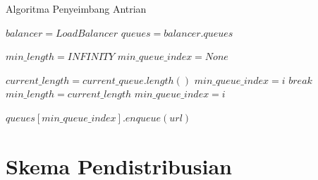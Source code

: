 \begin{algorithm}[H]
  \caption{Algoritma Penyeimbang Antrian}\label{alg:peer-to-peer}
  \begin{algorithmic}
    \State $balancer = LoadBalancer$
    \State $queues = balancer.queues$

    \item[] %

        \State $min\_length = INFINITY$
        \State $min\_queue\_index = None$
        
        \item[] %

            \State $current\_length = current\_queue.length()$
                \State $min\_queue\_index = i$
                \State $break$
                \State $min\_length = current\_length$
                \State $min\_queue\_index = i$
              \EndIf
          \EndFor
      \EndFor

      \State $queues[min\_queue\_index].enqueue(url)$
    \EndFunction
  \end{algorithmic}
\end{algorithm}

\section{Skema Pendistribusian}

